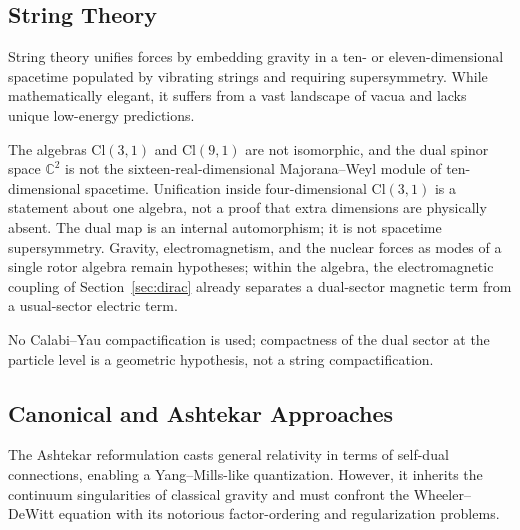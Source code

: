 \documentclass[a4paper]{article}
\begin{document}
\subsection{String Theory}

String theory unifies forces by embedding gravity in a ten- or eleven-dimensional spacetime populated by vibrating strings and requiring supersymmetry. While mathematically elegant, it suffers from a vast landscape of vacua and lacks unique low-energy predictions.

The algebras $\mathrm{Cl}(3,1)$ and $\mathrm{Cl}(9,1)$ are not isomorphic, and the dual spinor space $\mathbb{C}^2$ is not the sixteen-real-dimensional Majorana--Weyl module of ten-dimensional spacetime. Unification inside four-dimensional $\mathrm{Cl}(3,1)$ is a statement about one algebra, not a proof that extra dimensions are physically absent. The dual map is an internal automorphism; it is not spacetime supersymmetry. Gravity, electromagnetism, and the nuclear forces as modes of a single rotor algebra remain hypotheses; within the algebra, the electromagnetic coupling of Section~\ref{sec:dirac} already separates a dual-sector magnetic term from a usual-sector electric term.

No Calabi--Yau compactification is used; compactness of the dual sector at the particle level is a geometric hypothesis, not a string compactification.

\subsection{Canonical and Ashtekar Approaches}

The Ashtekar reformulation casts general relativity in terms of self-dual connections, enabling a Yang--Mills-like quantization. However, it inherits the continuum singularities of classical gravity and must confront the Wheeler--DeWitt equation with its notorious factor-ordering and regularization problems.
\end{document}
